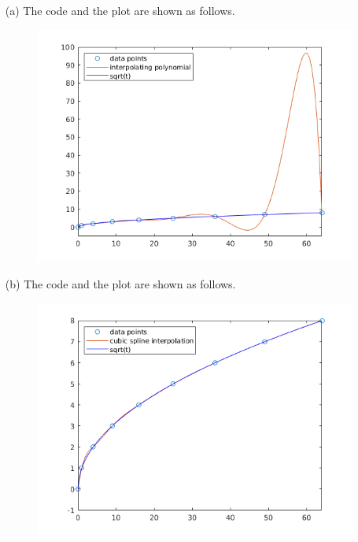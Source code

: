 \begin{sol}
  \begin{multicols}{2}
    \begin{itemize}
      \item[(a)]
        \setlength{\columnseprule}{0.2pt}
          The code and the plot are shown as follows.
          

              \begin{figure}[H]
      \centering
      \includegraphics[scale=0.48]{png/polyinterp.png}
    \end{figure}

  \item[(b)]
    The code and the plot are shown as follows.
    
    \begin{figure}[H]
      \centering
      \includegraphics[scale=0.48]{png/cubicSpline.png}
    \end{figure}


\end{itemize}
\end{multicols}
\end{sol}
